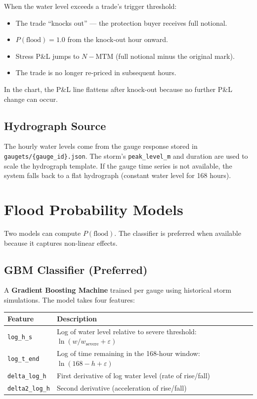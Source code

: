 \documentclass[11pt,a4paper]{article}
\begin{document}
When the water level exceeds a trade's trigger threshold:
\begin{itemize}
  \item The trade ``knocks out'' --- the protection buyer receives
        full notional.
  \item $P(\text{flood}) = 1.0$ from the knock-out hour onward.
  \item Stress P\&L jumps to $N - \text{MTM}$ (full notional minus
        the original mark).
  \item The trade is no longer re-priced in subsequent hours.
\end{itemize}

\noindent In the chart, the P\&L line flattens after knock-out because
no further P\&L change can occur.

\subsection{Hydrograph Source}

The hourly water levels come from the gauge response stored in
\texttt{gaugets/\{gauge\_id\}.json}.  The storm's \texttt{peak\_level\_m}
and duration are used to scale the hydrograph template.  If the gauge
time series is not available, the system falls back to a flat hydrograph
(constant water level for 168 hours).


\section{Flood Probability Models}

Two models can compute $P(\text{flood})$.  The classifier is preferred
when available because it captures non-linear effects.

\subsection{GBM Classifier (Preferred)}

A \textbf{Gradient Boosting Machine} trained per gauge using historical
storm simulations.  The model takes four features:

\begin{center}
\begin{tabular}{lp{8cm}}
\toprule
\textbf{Feature} & \textbf{Description} \\
\midrule
\texttt{log\_h\_s} & Log of water level relative to severe threshold:
  $\ln(w / w_{\text{severe}} + \varepsilon)$ \\
\texttt{log\_t\_end} & Log of time remaining in the 168-hour window:
  $\ln(168 - h + \varepsilon)$ \\
\texttt{delta\_log\_h} & First derivative of log water level
  (rate of rise/fall) \\
\texttt{delta2\_log\_h} & Second derivative (acceleration of
  rise/fall) \\
\bottomrule
\end{tabular}
\end{center}
\end{document}
